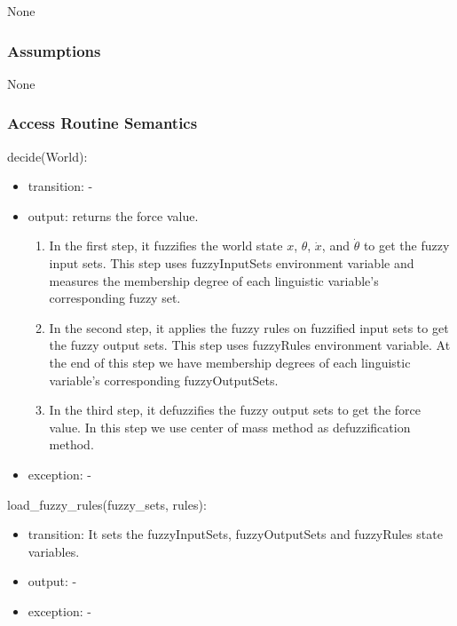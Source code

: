 \documentclass[12pt, titlepage]{article}
\begin{document}
None

\subsubsection{Assumptions}

None

\subsubsection{Access Routine Semantics}

\noindent decide(World):
\begin{itemize}
\item transition: -
\item output: returns the force value.
      \begin{enumerate}
        \item In the first step, it fuzzifies the world state $x$, $\theta$, $\dot{x}$,
        and $\dot{\theta}$ to get the fuzzy input sets. This step uses fuzzyInputSets
        environment variable and measures the membership degree of each linguistic
        variable's corresponding fuzzy set.
        \item In the second step, it applies the fuzzy rules on fuzzified input sets to
        get the fuzzy output sets. This step uses fuzzyRules environment variable.
        At the end of this step we have membership degrees of each linguistic 
        variable's corresponding fuzzyOutputSets.
        \item In the third step, it defuzzifies the fuzzy output sets to get the force
        value. In this step we use center of mass method as defuzzification method.
      \end{enumerate}
\item exception: -
\end{itemize}

\noindent load\_fuzzy\_rules(fuzzy\_sets, rules):
\begin{itemize}
\item transition: 
      It sets the fuzzyInputSets, fuzzyOutputSets and fuzzyRules state variables.
\item output: -
\item exception: -
\end{itemize}
\end{document}
